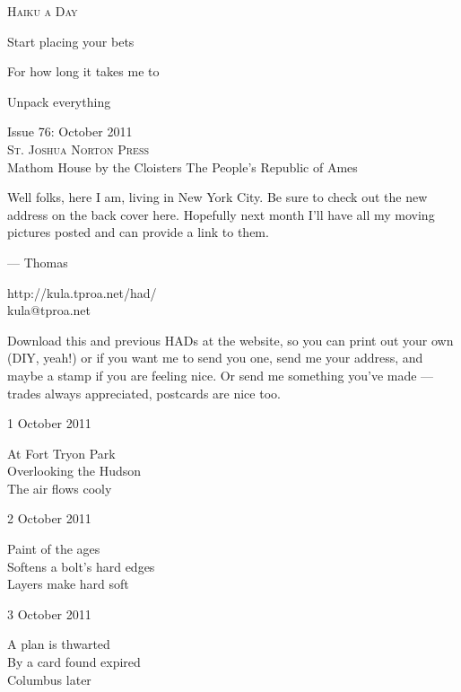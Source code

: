 \documentclass[12pt]{article}
\begin{document}
\begin{center}
{\fontsize{36}{48}\selectfont \textsc{Haiku a Day }}
\end{center}

\vspace*{3.5cm}

{\fontsize{20}{40}\selectfont 


Start placing your bets

For how long it takes me to

Unpack everything

}

\vspace*{5.0cm}
\begin{center}
{\large{Issue 76: October 2011}} \\[5mm]
{\fontsize{8}{8}\selectfont  \textsc{ St. Joshua Norton Press }} \\[1mm]
{\fontsize{6}{6}\selectfont Mathom House by the Cloisters \textbar The People's Republic of Ames }
\end{center}


\newpage

Well folks, here I am, living in New York City. Be sure to check out the new
address on the back cover here. Hopefully next month I'll have all my moving
pictures posted and can provide a link to them.


--- Thomas

http://kula.tproa.net/had/ \\
kula@tproa.net

Download this and previous HADs at the website, so you can
print out your own (DIY, yeah!) or if you want me to send
you one, send me your address, and maybe a stamp if you
are feeling nice. Or send me something you've made ---
trades always appreciated, postcards are nice too.

\vfill

1 October 2011

At Fort Tryon Park \\
Overlooking the Hudson \\
The air flows cooly

2 October 2011

Paint of the ages \\
Softens a bolt's hard edges \\
Layers make hard soft

3 October 2011

A plan is thwarted \\
By a card found expired \\
Columbus later
\end{document}
